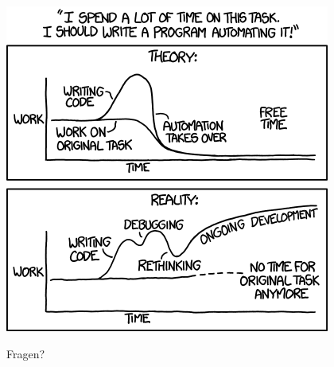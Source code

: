 \begin{frame}[plain]
  \vspace*{3ex}
  \centerline{\includegraphics[height=0.9\textheight]{files/xkcd1319_automation.png}}
\end{frame}

\begin{frame}[plain]
  \centerline{\Huge Fragen?}
\end{frame}



